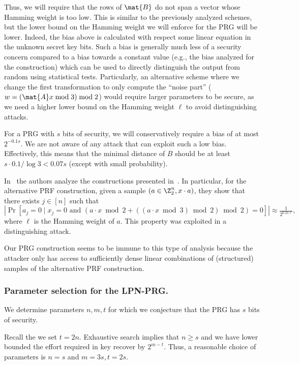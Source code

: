 Thus, we will require
that the rows of $\mat{B}$ do not span a vector whose Hamming weight is too low.
This is similar to the previously analyzed schemes,
but the lower bound on the Hamming weight we will enforce for the PRG will be lower.
Indeed, the bias above is calculated with respect some linear equation in the unknown secret key bits.
Such a bias is generally much less of a security concern compared to a bias towards a constant value
(e.g., the bias analyzed for the \ttwPRF construction) which can be used
to directly distinguish the output from random using statistical tests.
Particularly, an alternative scheme where we change the first transformation
to only compute the ``noise part''
($w =(\mat{A}x \bmod 3) \bmod 2$) would require larger parameters to be secure,
as we need a higher lower bound on the Hamming weight $\ell$ to avoid distinguishing attacks.

For a PRG with $s$ bits of security, we will conservatively require a bias of at most $2^{-0.1 s}$.
We are not aware of any attack that can exploit such a low bias.
Effectively, this means that the minimal distance of $B$ should be
at least $s \cdot 0.1/\log 3 < 0.07 s$ (except with small probability).


\begin{remark}
In~\cite{cheon2020-adventures} the authors analyze the constructions presented in~\cite{boneh2018-darkmatter}.
In particular, for the alternative PRF construction,
given a sample $(a \in \Z_2^n, x \cdot a)$,
they show that there exists $j \in [n]$ such that
$$|\Pr[a_j = 0 \mid x_j = 0 \text{ and } (a \cdot x \bmod 2 + ((a \cdot x \bmod 3) \bmod 2) \bmod 2) = 0]| \approx \tfrac{1}{2^{0.21 \ell}},$$
where $\ell$ is the Hamming weight of $a$.
This property was exploited in a distinguishing attack.

Our PRG construction seems to be immune to this type of analysis
because the attacker only has access to sufficiently dense linear combinations of (structured) samples
of the alternative PRF construction.
\end{remark}


\subsubsection{Parameter selection for the LPN-PRG.}

We determine parameters $n,m,t$ for which
we conjecture that the
PRG has $s$ bits of security.

Recall the we set $t = 2n$.
Exhaustive search implies that $n \geq s$ and we have lower
bounded the effort required in key recover by $2^{m - t}$.
Thus, a reasonable choice of parameters is $n = s$ and $m = 3s, t = 2s$.

